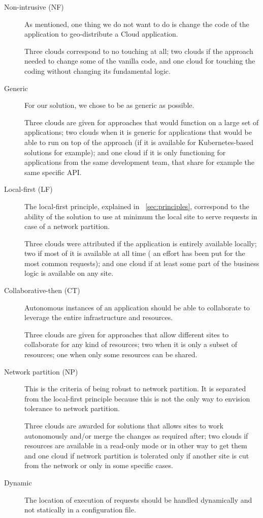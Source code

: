 \begin{description}
\item [Non-intrusive (NF)] As mentioned, one thing we do not want to
  do is change the code of the application to geo-distribute a Cloud
  application.

  Three clouds correspond to no touching at all; two clouds if the
  approach needed to change some of the vanilla code, and one cloud
  for touching the coding without changing its fundamental logic.
\item [Generic] For our solution, we chose to be as generic as
  possible.

  Three clouds are given for approaches that would function on a large
  set of applications; two clouds when it is generic for applications
  that would be able to run on top of the approach (if it is available
  for Kubernetes-based solutions for example); and one cloud if it is
  only functioning for applications from the same development team,
  that share for example the same specific \acrshort{API}.
\item [Local-first (LF)] The local-first principle, explained in
  ~\autoref{sec:principles}, correspond to the ability of the solution
  to use at minimum the local site to serve requests in case of a
  network partition.

  Three clouds were attributed if the application is entirely
  available locally; two if most of it is available at all time (\eg
  an effort has been put for the most common requests); and one cloud
  if at least some part of the business logic is available on any
  site.
\item [Collaborative-then (CT)] Autonomous instances of an application
  should be able to collaborate to leverage the entire infrastructure
  and resources.

  Three clouds are given for approaches that allow different sites to
  collaborate for any kind of resources; two when it is only a subset
  of resources; one when only some resources can be shared.
\item [Network partition (NP)] This is the criteria of being robust to
  network partition.
  It is separated from the local-first principle because this is not
  the only way to envision tolerance to network partition.

  Three clouds are awarded for solutions that allows sites to work
  autonomously and/or merge the changes as required after; two clouds
  if resources are available in a read-only mode or in other way to
  get them and one cloud if network partition is tolerated only if
  another site is cut from the network or only in some specific cases.
\item [Dynamic] The location of execution of requests should be
  handled dynamically and not statically in a configuration file.


\end{description}
